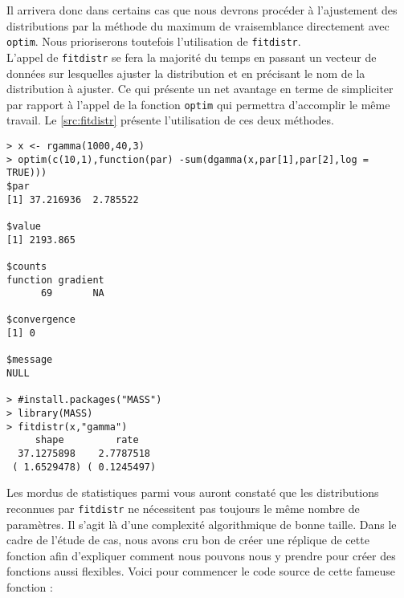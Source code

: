 Il arrivera donc dans certains cas que nous devrons procéder à l'ajustement des distributions par la méthode du maximum de vraisemblance directement avec \texttt{optim}. Nous prioriserons toutefois l'utilisation de \texttt{fitdistr}. \\

L'appel de \texttt{fitdistr} se fera la majorité du temps en passant un vecteur de données sur lesquelles ajuster la distribution et en précisant le nom de la distribution à ajuster. Ce qui présente un net avantage en terme de simpliciter par rapport à l'appel de la fonction \texttt{optim} qui permettra d'accomplir le même travail. Le \autoref{src:fitdistr} présente l'utilisation de ces deux méthodes. \\

\begin{lstlisting}[caption = Ajustement de distribution sur données empiriques,label=src:fitdistr]
> x <- rgamma(1000,40,3)
> optim(c(10,1),function(par) -sum(dgamma(x,par[1],par[2],log = TRUE)))
$par
[1] 37.216936  2.785522

$value
[1] 2193.865

$counts
function gradient 
      69       NA 

$convergence
[1] 0

$message
NULL

> #install.packages("MASS")
> library(MASS)
> fitdistr(x,"gamma")
     shape         rate   
  37.1275898    2.7787518 
 ( 1.6529478) ( 0.1245497)
\end{lstlisting}

Les mordus de statistiques parmi vous auront constaté que les distributions reconnues par \texttt{fitdistr} ne nécessitent pas toujours le même nombre de paramètres. Il s'agit là d'une complexité algorithmique de bonne taille. Dans le cadre de l'étude de cas, nous avons cru bon de créer une réplique de cette fonction afin d'expliquer comment nous pouvons nous y prendre pour créer des fonctions aussi flexibles. Voici pour commencer le code source de cette fameuse fonction : \\

